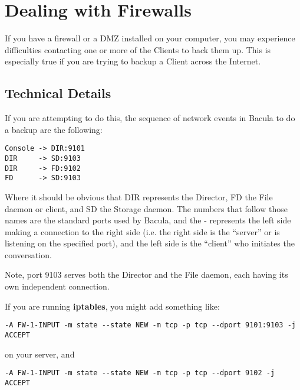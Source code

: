 
\section*{Dealing with Firewalls}
\label{_ChapterStart26}

If you have a firewall or a DMZ installed on your computer, you may experience
difficulties contacting one or more of the Clients to back them up. This is
especially true if you are trying to backup a Client across the Internet. 

\subsection*{Technical Details}

If you are attempting to do this, the sequence of network events in Bacula to
do a backup are the following: 

\footnotesize
\begin{verbatim}
Console -> DIR:9101
DIR     -> SD:9103
DIR     -> FD:9102
FD      -> SD:9103
\end{verbatim}
\normalsize

Where it should be obvious that DIR represents the Director, FD the File
daemon or client, and SD the Storage daemon. The numbers that follow those
names are the standard ports used by Bacula, and the -\gt{} represents the
left side making a connection to the right side (i.e. the right side is the
``server'' or is listening on the specified port), and the left side is the
``client'' who initiates the conversation. 

Note, port 9103 serves both the Director and the File daemon, each having its
own independent connection. 

If you are running {\bf iptables}, you might add something like: 

\footnotesize
\begin{verbatim}
-A FW-1-INPUT -m state --state NEW -m tcp -p tcp --dport 9101:9103 -j ACCEPT
\end{verbatim}
\normalsize

on your server, and 

\footnotesize
\begin{verbatim}
-A FW-1-INPUT -m state --state NEW -m tcp -p tcp --dport 9102 -j ACCEPT
\end{verbatim}
\normalsize

